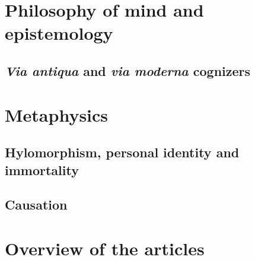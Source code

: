 \documentclass[]{article}
\begin{document}
\section{Philosophy of mind and epistemology}
\subsection{\textit{Via antiqua} and \textit{via moderna} cognizers}
\section{Metaphysics}
\subsection{Hylomorphism, personal identity and immortality}
\subsection{Causation}
\section{Overview of the articles}

\printbibliography
\end{document}
